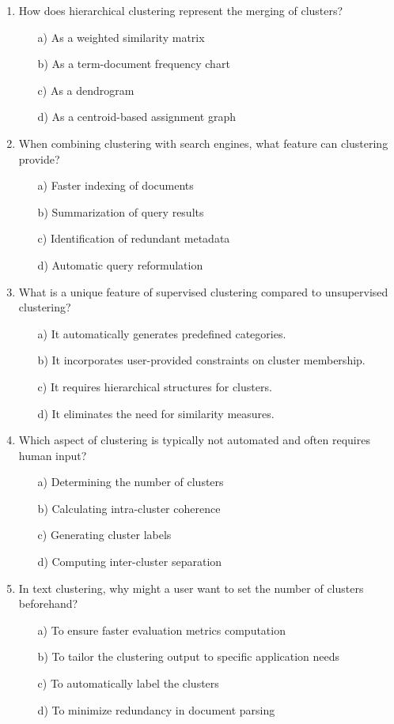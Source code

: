 \documentclass[8pt]{extarticle}
\begin{document}
\begin{multicols}{2}
\begin{enumerate}
\item How does hierarchical clustering represent the merging of clusters?
\begin{itemize}
\item[a)] As a weighted similarity matrix
\item[b)] As a term-document frequency chart
\item[c)] As a dendrogram
\item[d)] As a centroid-based assignment graph
\end{itemize}

\item When combining clustering with search engines, what feature can clustering provide?
\begin{itemize}
\item[a)] Faster indexing of documents
\item[b)] Summarization of query results
\item[c)] Identification of redundant metadata
\item[d)] Automatic query reformulation
\end{itemize}

\item What is a unique feature of supervised clustering compared to unsupervised clustering?
\begin{itemize}
\item[a)] It automatically generates predefined categories.
\item[b)] It incorporates user-provided constraints on cluster membership.
\item[c)] It requires hierarchical structures for clusters.
\item[d)] It eliminates the need for similarity measures.
\end{itemize}

\item Which aspect of clustering is typically not automated and often requires human input?
\begin{itemize}
\item[a)] Determining the number of clusters
\item[b)] Calculating intra-cluster coherence
\item[c)] Generating cluster labels
\item[d)] Computing inter-cluster separation
\end{itemize}

\item In text clustering, why might a user want to set the number of clusters beforehand?
\begin{itemize}
\item[a)] To ensure faster evaluation metrics computation
\item[b)] To tailor the clustering output to specific application needs
\item[c)] To automatically label the clusters
\item[d)] To minimize redundancy in document parsing
\end{itemize}


\end{enumerate}
\end{multicols}
\end{document}
